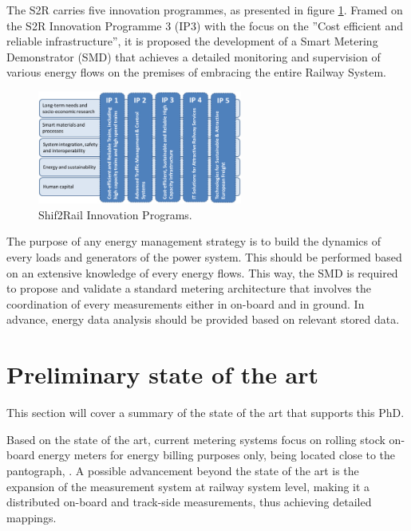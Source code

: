 The S2R carries five innovation programmes, as presented in figure \ref{fig:ips}. Framed on the S2R Innovation Programme 3 (IP3) with the focus on the ”Cost efficient and reliable infrastructure”, it is proposed the development of a Smart Metering Demonstrator (SMD) that achieves a detailed monitoring and supervision of various energy flows on the premises of embracing the entire Railway System.

\begin{figure}[h!]
	\centering
	\includegraphics[width=0.60\textwidth,keepaspectratio]{figures/1.Intro/IPs}
	\caption{Shif2Rail Innovation Programs. }
	\label{fig:ips}
\end{figure}

The purpose of any energy management strategy is to build the dynamics of every loads and generators of the power system. 
This should be performed based on an extensive knowledge of every energy flows. 
This way, the SMD is required to propose and validate a standard metering architecture that involves the coordination of every measurements either in on-board and in ground. 
In advance, energy data analysis should be provided based on relevant stored data. 

\section{Preliminary state of the art}

This section will cover a summary of the state of the art that supports this PhD.

Based on the state of the art, current metering systems focus on rolling stock on-board energy meters for energy billing purposes only, being located close to the pantograph, \cite{shift2rail2015}.
A possible advancement beyond the state of the art is the expansion of the measurement system at railway system level, making it a distributed on-board and track-side measurements, thus achieving detailed mappings. 


